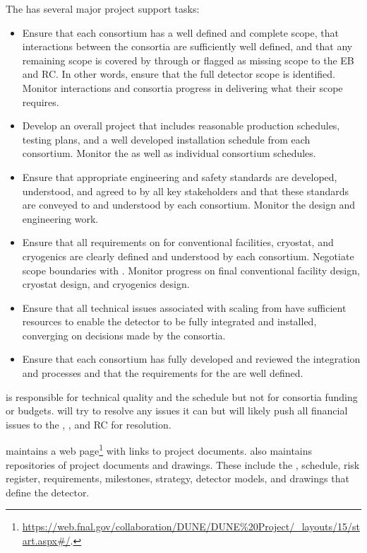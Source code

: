 The  has several major project support tasks:
\begin{itemize}
\item Ensure that each consortium has a well defined and complete
  scope, that interactions between the consortia are sufficiently
  well defined, and that any remaining scope is covered by 
  through  or flagged as missing scope to the EB and RC. In
  other words, ensure that the full detector scope is
  identified. Monitor interactions and consortia progress in
  delivering what their scope requires.
\item Develop an overall project 
  that includes reasonable production schedules, testing plans, and a
  well developed installation schedule from each consortium. Monitor
  the  as well as individual consortium schedules.
\item Ensure that appropriate engineering and safety standards are
  developed, understood, and agreed to by all key stakeholders and that these
  standards are conveyed to and understood by each
  consortium. Monitor the design and engineering work.
\item Ensure that all  requirements on  for
  conventional facilities, cryostat, and cryogenics are clearly
  defined and understood by each consortium. Negotiate scope
  boundaries with . Monitor  progress on
  final conventional facility design, cryostat design, and cryogenics
  design.
\item Ensure that all technical issues associated with scaling from
   have sufficient resources to enable the detector to be fully integrated and
  installed, converging on
  decisions made by the consortia.
\item Ensure that each consortium has fully developed and reviewed the integration and  processes and that the requirements for the  are well defined.
\end{itemize}

 is responsible for technical quality and the schedule but not
for consortia funding or budgets.   will try to resolve any issues it can but will likely push all
financial issues to the , , and RC for resolution.

 maintains a web
page\footnote{\url{https://web.fnal.gov/collaboration/DUNE/DUNE\%20Project/\_layouts/15/start.aspx\#/}.}
with links to project documents.  also maintains repositories of
project documents and drawings. These include the ,
schedule, risk register, requirements, milestones, strategy, detector
models, and drawings that define the  detector.

